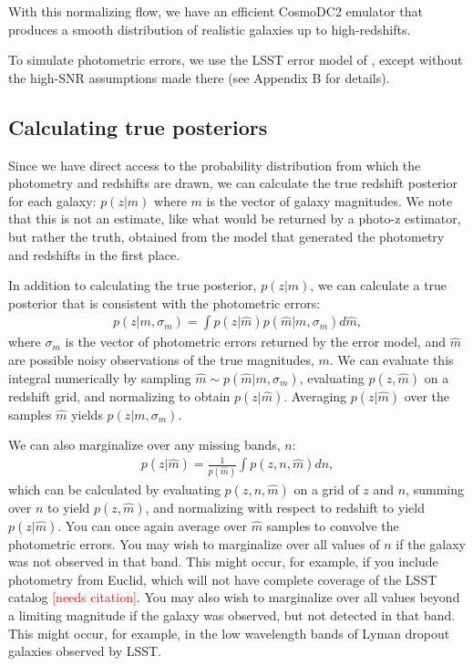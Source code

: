 \documentclass[twocolumn]{aastex631}
\newcommand{\note}[1]{\textsf{\textcolor{red}{#1}}}
\newcommand{\needscite}{\note{[needs citation]}}
\begin{document}
With this normalizing flow, we have an efficient CosmoDC2 emulator that produces a smooth distribution of realistic galaxies up to high-redshifts.

To simulate photometric errors, we use the LSST error model of \citet{ivezic2019}, except without the high-SNR assumptions made there (see Appendix B for details).

\subsection{Calculating true posteriors}
\label{sec:true-posteriors}

Since we have direct access to the probability distribution from which the photometry and redshifts are drawn, we can calculate the true redshift posterior for each galaxy: $p(z|m)$ where $m$ is the vector of galaxy magnitudes.
We note that this is not an estimate, like what would be returned by a photo-z estimator, but rather the truth, obtained from the model that generated the photometry and redshifts in the first place.

In addition to calculating the true posterior, $p(z|m)$, we can calculate a true posterior that is consistent with the photometric errors:
\begin{align}
    p(z|m, \sigma_m) = \int p(z|\hat{m}) p(\hat{m}|m, \sigma_m) d\hat{m},
    \label{eq:err-conv}
\end{align}
where $\sigma_m$ is the vector of photometric errors returned by the error model, and $\hat{m}$ are possible noisy observations of the true magnitudes, $m$.
We can evaluate this integral numerically by sampling $\hat{m} \sim p(\hat{m}|m, \sigma_m)$, evaluating $p(z, \hat{m})$ on a redshift grid, and normalizing to obtain $p(z|\hat{m})$.
Averaging $p(z|\hat{m})$ over the samples $\hat{m}$ yields $p(z|m, \sigma_m)$.

We can also marginalize over any missing bands, $n$:
\begin{align}
    p(z|\hat{m}) = \frac{1}{p(\hat{m})} \int p(z, n, \hat{m}) dn,
\end{align}
which can be calculated by evaluating $p(z, n, \hat{m})$ on a grid of $z$ and $n$, summing over $n$ to yield $p(z, \hat{m})$, and normalizing with respect to redshift to yield $p(z|\hat{m})$.
You can once again average over $\hat{m}$ samples to convolve the photometric errors.
You may wish to marginalize over all values of $n$ if the galaxy was not observed in that band.
This might occur, for example, if you include photometry from Euclid, which will not have complete coverage of the LSST catalog \needscite.
You may also wish to marginalize over all values beyond a limiting magnitude if the galaxy was observed, but not detected in that band.
This might occur, for example, in the low wavelength bands of Lyman dropout galaxies observed by LSST.
\end{document}
